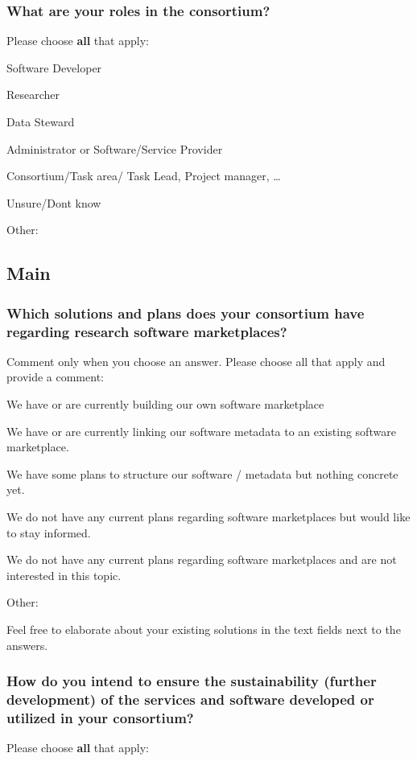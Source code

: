\documentclass[headsepline,titlepage,twoside,12pt,toc=flat,headings=normal]{scrreprt}
\newcommand{\question}[1]{\subsubsection{#1}}
\newcommand{\otherbox}{\fbox{\phantom{This is how big an answer would be.}}}
\begin{document}
\question{What are your roles in the consortium?}
Please choose \textbf{all} that apply:

\begin{answers}
\item Software Developer
\item Researcher
\item Data Steward
\item Administrator or Software/Service Provider
\item Consortium/Task area/ Task Lead, Project manager, \ldots{}
\item Unsure/Don\textquotesingle t know
\item Other: \otherbox
\end{answers}

\newpage
\subsection{Main}\label{main}

\question{Which solutions and plans does your consortium have regarding research software marketplaces?}

Comment only when you choose an answer.
Please choose all that apply and provide a comment:

\begin{answers}
\item We have or are currently building our own software marketplace
\item We have or are currently linking our software metadata to an existing software marketplace.
\item We have some plans to structure our software / metadata but nothing concrete yet.
\item We do not have any current plans regarding software marketplaces but would like to stay informed.
\item We do not have any current plans regarding software marketplaces and are not interested in this topic.
\item Other: \otherbox
\end{answers}

Feel free to elaborate about your existing solutions in the text fields
next to the answers.

\question{How do you intend to ensure the sustainability (further development) of the services and software developed or utilized in your consortium?}

Please choose \textbf{all} that apply:
\end{document}
